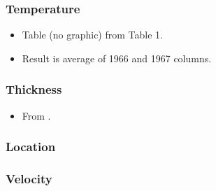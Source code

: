 \documentclass[article,a4paper,times,11pt,twoside]{article}
\begin{document}
\subsubsection{Temperature}
\label{sec:org5192686}

\begin{itemize}
\item Table (no graphic) from \textcite{paterson_1968} Table 1.
\item Result is average of 1966 and 1967 columns.
\end{itemize}

\subsubsection{Thickness}
\label{sec:org36386f4}

\begin{itemize}
\item From \textcite{paterson_1968}.
\end{itemize}

\subsubsection{Location}
\label{sec:org72a7cbd}

\subsubsection{Velocity}
\label{sec:orga23be3f}
\clearpage
\end{document}
